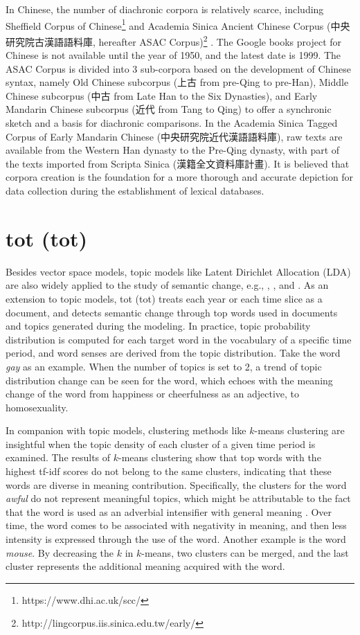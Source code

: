 In Chinese, the number of diachronic corpora is relatively scarce, including Sheffield Corpus of Chinese\footnote{https://www.dhi.ac.uk/scc/} and Academia Sinica Ancient Chinese Corpus (中央研究院古漢語語料庫, hereafter ASAC Corpus)\footnote{http://lingcorpus.iis.sinica.edu.tw/early/} \parencite{wei1997corpus}. The Google books project for Chinese is not available until the year of 1950, and the latest date is 1999. The ASAC Corpus is divided into 3 sub-corpora based on the development of Chinese syntax, namely Old Chinese subcorpus (上古 from pre-Qing to pre-Han), Middle Chinese subcorpus (中古 from Late Han to the Six Dynasties), and Early Mandarin Chinese subcorpus (近代 from Tang to Qing) to offer a synchronic sketch and a basis for diachronic comparisons. In the Academia Sinica Tagged Corpus of Early Mandarin Chinese (中央研究院近代漢語語料庫), raw texts are available from the Western Han dynasty to the Pre-Qing dynasty, with part of the texts imported from Scripta Sinica (漢籍全文資料庫計畫). It is believed that corpora creation is the foundation for a more thorough and accurate depiction for data collection during the establishment of lexical databases.

\section{\acrlong{tot} (\acrshort{tot})}
Besides vector space models, topic models like Latent Dirichlet Allocation (LDA) are also widely applied to the study of semantic change, e.g., \textcite{wang2006topics}, \textcite{wijaya2011understanding}, and \textcite{hengchen2017phd}. As an extension to topic models, \acrlong{tot} (\acrshort{tot}) treats each year or each time slice as a document, and detects semantic change through top words used in documents and topics generated during the modeling. In practice, topic probability distribution is computed for each target word in the vocabulary of a specific time period, and word senses are derived from the topic distribution. Take the word \textit{gay} as an example. When the number of topics is set to 2, a trend of topic distribution change can be seen for the word, which echoes with the meaning change of the word from happiness or cheerfulness as an adjective, to homosexuality.

In companion with topic models, clustering methods like $k$-means clustering are insightful when the topic density of each cluster of a given time period is examined. The results of $k$-means clustering show that top words with the highest tf-idf scores do not belong to the same clusters, indicating that these words are diverse in meaning contribution. Specifically, the clusters for the word \textit{awful} do not represent meaningful topics, which might be attributable to the fact that the word is used as an adverbial intensifier with general meaning \parencite{wijaya2011understanding}. Over time, the word comes to be associated with negativity in meaning, and then less intensity is expressed through the use of the word. Another example is the word \textit{mouse}. By decreasing the $k$ in $k$-means, two clusters can be merged, and the last cluster represents the additional meaning acquired with the word.

